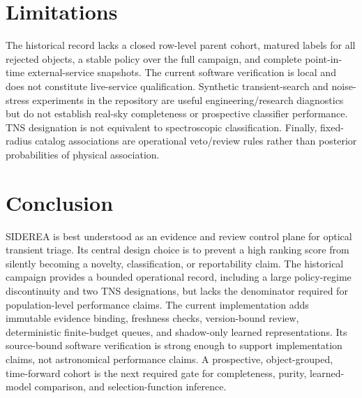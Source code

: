 \documentclass[10pt,conference]{IEEEtran}
\begin{document}
\section{Limitations}
The historical record lacks a closed row-level parent cohort, matured labels for all rejected objects, a stable policy over the full campaign, and complete point-in-time external-service snapshots. The current software verification is local and does not constitute live-service qualification. Synthetic transient-search and noise-stress experiments in the repository are useful engineering/research diagnostics but do not establish real-sky completeness or prospective classifier performance. TNS designation is not equivalent to spectroscopic classification. Finally, fixed-radius catalog associations are operational veto/review rules rather than posterior probabilities of physical association.

\section{Conclusion}
SIDEREA is best understood as an evidence and review control plane for optical transient triage. Its central design choice is to prevent a high ranking score from silently becoming a novelty, classification, or reportability claim. The historical campaign provides a bounded operational record, including a large policy-regime discontinuity and two TNS designations, but lacks the denominator required for population-level performance claims. The current implementation adds immutable evidence binding, freshness checks, version-bound review, deterministic finite-budget queues, and shadow-only learned representations. Its source-bound software verification is strong enough to support implementation claims, not astronomical performance claims. A prospective, object-grouped, time-forward cohort is the next required gate for completeness, purity, learned-model comparison, and selection-function inference.



\end{document}
